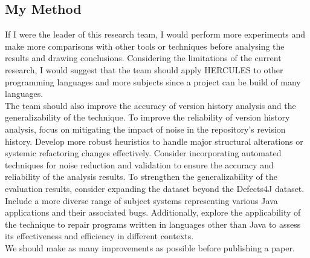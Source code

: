 \documentclass[runningheads]{llncs}
\begin{document}
\subsection{My Method}
If I were the leader of this research team, I would perform more experiments and make more comparisons with other tools or techniques before analysing the results and drawing conclusions.
Considering the limitations of the current research, I would suggest that the team should apply HERCULES to other programming languages and more subjects since a project can be build of many languages.\\
The team should also improve the accuracy of version history analysis and the generalizability of the technique.
To improve the reliability of version history analysis, focus on mitigating the impact of noise in the repository's revision history. Develop more robust heuristics to handle major structural alterations or systemic refactoring changes effectively. Consider incorporating automated techniques for noise reduction and validation to ensure the accuracy and reliability of the analysis results.
To strengthen the generalizability of the evaluation results, consider expanding the dataset beyond the Defects4J dataset. Include a more diverse range of subject systems representing various Java applications and their associated bugs. Additionally, explore the applicability of the technique to repair programs written in languages other than Java to assess its effectiveness and efficiency in different contexts.\\
We should make as many improvements as possible before publishing a paper.
\end{document}
